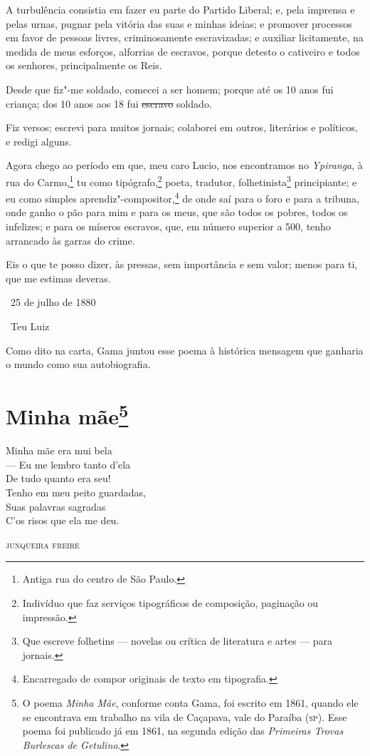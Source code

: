 A turbulência consistia em fazer eu parte do Partido Liberal; e, pela
imprensa e pelas urnas, pugnar pela vitória das suas e minhas ideias; e
promover processos em favor de pessoas livres, criminosamente
escravizadas; e auxiliar licitamente, na medida de meus esforços,
alforrias de escravos, porque detesto o cativeiro e todos os senhores,
principalmente os Reis.

Desde que fiz"-me soldado, comecei a ser homem; porque até os 10 anos fui
criança; dos 10 anos aos 18 fui \sout{escravo} soldado.

Fiz versos; escrevi para muitos jornais; colaborei em outros, literários
e políticos, e redigi alguns.

Agora chego ao período em que, meu caro Lucio, nos encontramos no
\emph{Ypiranga}, à rua do Carmo,\footnote{Antiga rua do centro de São
  Paulo.} tu como tipógrafo,\footnote{Indivíduo que faz serviços
  tipográficos de composição, paginação ou impressão.} poeta, tradutor,
folhetinista\footnote{Que escreve folhetins --- novelas ou crítica de
  literatura e artes --- para jornais.} principiante; e eu como simples
aprendiz"-compositor,\footnote{Encarregado de compor originais de texto
  em tipografia.} de onde
saí para o foro e para a tribuna, onde ganho o pão para mim e para os
meus, que são todos os pobres, todos os infelizes; e para os míseros
escravos, que, em número superior a 500, tenho arrancado às garras do
crime.

Eis o que te posso dizer, às pressas, sem importância e sem valor; menos
para ti, que me estimas deveras.

\bigskip

\hfill\ 25 de julho de 1880\smallskip

\hfill\ Teu Luiz

\pagebreak
\mbox{}\vfill
\thispagestyle{empty}

{\small\noindent
Como dito na carta, Gama juntou esse poema à histórica mensagem
que ganharia o mundo como sua autobiografia. }

\chapter{Minha mãe\footnote[*]{O poema \emph{Minha Mãe}, conforme
  conta Gama, foi escrito em 1861, quando ele se encontrava em trabalho
  na vila de Caçapava, vale do Paraíba (\textsc{sp}). Esse poema foi publicado já
  em 1861, na segunda edição das \emph{Primeiras Trovas Burlescas de
  Getulino}.}}

{\setlength{\epigraphwidth}{.45\textwidth}
\epigraph{Minha mãe era mui bela\\
--- Eu me lembro tanto d'ela\\
De tudo quanto era seu!\\
Tenho em meu peito guardadas,\\
Suas palavras sagradas\\
C'os risos que ela me deu.}{\textsc{junqueira freire}\footnotemark}}


